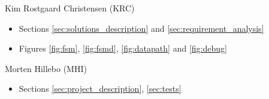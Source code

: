 Kim Rostgaard Christensen (KRC)
\begin{itemize}
\item Sections \ref{sec:solutions_description} and \ref{sec:requirement_analysis}
\item Figures \ref{fig:fsm}, \ref{fig:fsmd}, \ref{fig:datapath} and \ref{fig:debug}
\end{itemize}

Morten Hillebo (MHI) 
\begin{itemize}
\item Sections \ref{sec:project_description}, \ref{sec:tests}
\end{itemize}
